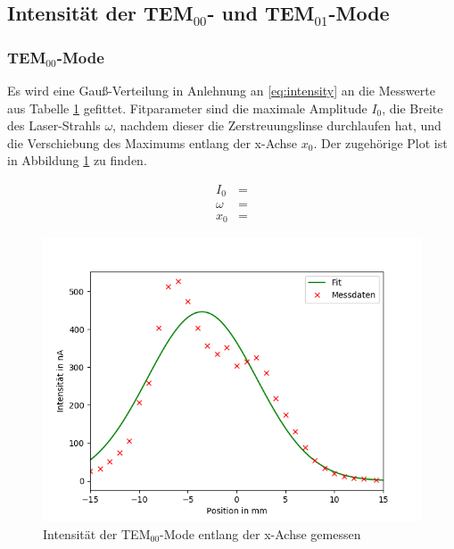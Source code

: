 \subsection{Intensität der TEM$_{00}$- und TEM$_{01}$-Mode}
\subsubsection{TEM$_{00}$-Mode}
Es wird eine Gauß-Verteilung in Anlehnung an \eqref{eq:intensity} an die Messwerte aus Tabelle \ref{fig:TEM_00} gefittet. Fitparameter sind die maximale Amplitude $I_0$, die Breite des Laser-Strahls $\omega$, nachdem dieser die Zerstreuungslinse durchlaufen hat, und die Verschiebung des Maximums entlang der x-Achse $x_0$. Der zugehörige Plot ist in Abbildung \ref{fig:TEM_00} zu finden.

\begin{align}
	I_0 &=  \\
	\omega &=   \\
	x_0 &= 
\end{align}
	
 


\begin{figure}[h!]
	\centering
	\includegraphics[width=.6\textwidth]{build/TEM_00.png}
	\caption{Intensität der TEM$_{00}$-Mode entlang der x-Achse gemessen}
	\label{fig:TEM_00}
\end{figure} 

